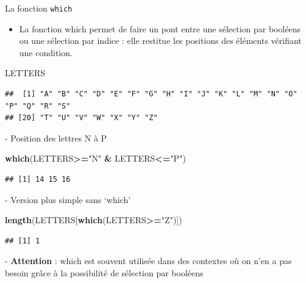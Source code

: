 \documentclass[
  ignorenonframetext,
]{beamer}
\newenvironment{Shaded}{\begin{snugshade}}{\end{snugshade}}
\newcommand{\FunctionTok}[1]{\textcolor[rgb]{0.13,0.29,0.53}{\textbf{#1}}}
\newcommand{\NormalTok}[1]{#1}
\newcommand{\SpecialCharTok}[1]{\textcolor[rgb]{0.81,0.36,0.00}{\textbf{#1}}}
\newcommand{\StringTok}[1]{\textcolor[rgb]{0.31,0.60,0.02}{#1}}
\providecommand{\tightlist}{%
  \setlength{\itemsep}{0pt}\setlength{\parskip}{0pt}}
\begin{document}
\begin{frame}[fragile]{La fonction \texttt{which}}
\protect\hypertarget{la-fonction-which}{}
\begin{itemize}
\tightlist
\item
  La fonction which permet de faire un pont entre une sélection par
  booléens ou une sélection par indice : elle restitue les positions des
  éléments vérifiant une condition.
\end{itemize}

\tiny

\begin{Shaded}
\begin{Highlighting}[]
\NormalTok{LETTERS}
\end{Highlighting}
\end{Shaded}

\begin{verbatim}
##  [1] "A" "B" "C" "D" "E" "F" "G" "H" "I" "J" "K" "L" "M" "N" "O" "P" "Q" "R" "S"
## [20] "T" "U" "V" "W" "X" "Y" "Z"
\end{verbatim}

\normalsize - Position des lettres N à P

\tiny

\begin{Shaded}
\begin{Highlighting}[]
\FunctionTok{which}\NormalTok{(LETTERS}\SpecialCharTok{\textgreater{}=}\StringTok{"N"} \SpecialCharTok{\&}\NormalTok{ LETTERS}\SpecialCharTok{\textless{}=}\StringTok{"P"}\NormalTok{)}
\end{Highlighting}
\end{Shaded}

\begin{verbatim}
## [1] 14 15 16
\end{verbatim}

\normalsize - Version plus simple sans `which'

\tiny

\begin{Shaded}
\begin{Highlighting}[]
\FunctionTok{length}\NormalTok{(LETTERS[}\FunctionTok{which}\NormalTok{(LETTERS}\SpecialCharTok{\textgreater{}=}\StringTok{"Z"}\NormalTok{)])}
\end{Highlighting}
\end{Shaded}

\begin{verbatim}
## [1] 1
\end{verbatim}

\normalsize - \textbf{Attention} : which est souvent utilisée dans des
contextes où on n'en a pas besoin grâce à la possibilité de sélection
par booléens
\end{frame}
\end{document}

